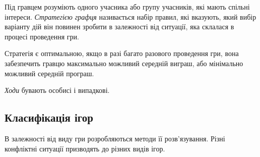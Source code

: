 \documentclass[12pt,a4paper]{article}
\begin{document}
Під гравцем розуміють одного учасника або групу учасників, які мають спільні інтереси. \emph{Стратегією графця} називається набір правил, які вказують, який вибір варіанту дій він повинен зробити в залежності від ситуації, яка склалася в процесі проведення гри.

Стратегія є оптимальною, якщо в разі багато разового проведення гри, вона забезпечить гравцю максимально можливий середній виграш, або мінімально можливий середній програш.

\emph{Ходи} бувають особисі і випадкові.

\subsection*{Класифікація ігор}

В залежності від виду гри розробляються методи її розв'язування. Різні конфліктні ситуації призводять до різних видів ігор.
\end{document}

